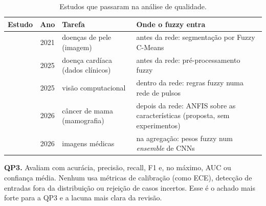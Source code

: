 \begin{table}[t]
\centering
\caption{Estudos que passaram na análise de qualidade.}
\label{tab:incluidos}
\footnotesize
\setlength{\tabcolsep}{3pt}
\begin{tabular}{@{}p{1.35cm}cp{2.45cm}p{2.75cm}@{}}
\toprule
Estudo & Ano & Tarefa & Onde o fuzzy entra \\
\midrule
\cite{reddy2021} & 2021 & doenças de pele (imagem) & antes da rede: segmentação por Fuzzy C-Means \\
\cite{divya2025} & 2025 & doença cardíaca (dados clínicos) & antes da rede: pré-processamento fuzzy \\
\cite{bhosale2025} & 2025 & visão computacional & dentro da rede: regras fuzzy numa rede de pulsos \\
\cite{abbasi2026} & 2026 & câncer de mama (mamografia) & depois da rede: ANFIS sobre as características (proposta, sem experimentos) \\
\cite{raut2026} & 2026 & imagens médicas & na agregação: pesos fuzzy num \textit{ensemble} de CNNs \\
\bottomrule
\end{tabular}
\end{table}


\textbf{QP3.} Avaliam com acurácia, precisão, recall, F1 e, no máximo, AUC ou confiança média. Nenhum usa métricas de calibração (como
ECE), detecção de entradas fora da distribuição ou rejeição de casos incertos. Esse é o achado mais forte para a QP3 e a lacuna mais clara
da revisão.


